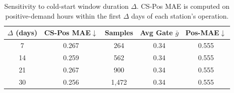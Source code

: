 \begin{table}[h]
\centering
\caption{Sensitivity to cold-start window duration $\Delta$. CS-Pos MAE is computed on positive-demand hours within the first $\Delta$ days of each station's operation.}
\label{tab:sensitivity_delta}
\small
\begin{tabular}{@{}ccccc@{}}
\toprule
$\Delta$ (days) & \textbf{CS-Pos MAE}$\downarrow$ & \textbf{Samples} & \textbf{Avg Gate $\bar{g}$} & \textbf{Pos-MAE}$\downarrow$ \\
\midrule
7 & 0.267 & 264 & 0.34 & 0.555 \\
14 & 0.259 & 562 & 0.34 & 0.555 \\
21 & 0.267 & 900 & 0.34 & 0.555 \\
30 & 0.256 & 1,472 & 0.34 & 0.555 \\
\bottomrule
\end{tabular}
\end{table}

